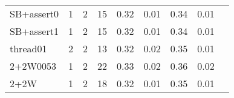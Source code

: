 {\begin{tabular}{l|r|r|r|r|r|r|r|l}
SB+assert0                                  & 1                                                                                                 & 2                                                                                                & 15                                                                                                                   & 0.32                            & 0.01                    & {\color[HTML]{00009B} 0.34}    & 0.01                       & \cite{genmc-PLDI19}                                                   \\
SB+assert1                                  & 1                                                                                                 & 2                                                                                                & 15                                                                                                                   & 0.32                            & 0.01                    & {\color[HTML]{00009B} 0.34}    & 0.01                       & \cite{genmc-PLDI19}                                                   \\
thread01                                    & 2                                                                                                 & 2                                                                                                & 13                                                                                                                   & 0.32                            & 0.02                    & {\color[HTML]{00009B} 0.35}    & 0.01                       & \cite{watts}                                                   \\
2+2W0053                                    & 1                                                                                                 & 2                                                                                                & 22                                                                                                                   & 0.33                            & 0.02                    & {\color[HTML]{00009B} 0.36}    & 0.02                       & \cite{tracer2018}                                                  \\
2+2W                                        & 1                                                                                                 & 2                                                                                                & 18                                                                                                                   & 0.32                            & 0.01                    & {\color[HTML]{00009B} 0.35}    & 0.01                       & \cite{tracer2018}                                                  \\

\end{tabular}}
